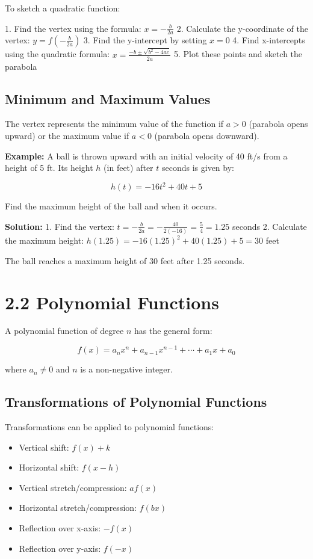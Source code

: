\documentclass[12pt]{article}
\begin{document}
To sketch a quadratic function:

1. Find the vertex using the formula: $x = -\frac{b}{2a}$
2. Calculate the y-coordinate of the vertex: $y = f(-\frac{b}{2a})$
3. Find the y-intercept by setting $x = 0$
4. Find x-intercepts using the quadratic formula: $x = \frac{-b \pm \sqrt{b^2 - 4ac}}{2a}$
5. Plot these points and sketch the parabola

\subsection{Minimum and Maximum Values}

The vertex represents the minimum value of the function if $a > 0$ (parabola opens upward) or the maximum value if $a < 0$ (parabola opens downward).

\textbf{Example:} A ball is thrown upward with an initial velocity of 40 ft/s from a height of 5 ft. Its height $h$ (in feet) after $t$ seconds is given by:

\[h(t) = -16t^2 + 40t + 5\]

Find the maximum height of the ball and when it occurs.

\textbf{Solution:}
1. Find the vertex: $t = -\frac{b}{2a} = -\frac{40}{2(-16)} = \frac{5}{4} = 1.25$ seconds
2. Calculate the maximum height: $h(1.25) = -16(1.25)^2 + 40(1.25) + 5 = 30$ feet

The ball reaches a maximum height of 30 feet after 1.25 seconds.

\section{2.2 Polynomial Functions}

A polynomial function of degree $n$ has the general form:

\[f(x) = a_nx^n + a_{n-1}x^{n-1} + \cdots + a_1x + a_0\]

where $a_n \neq 0$ and $n$ is a non-negative integer.

\subsection{Transformations of Polynomial Functions}

Transformations can be applied to polynomial functions:

\begin{itemize}
    \item Vertical shift: $f(x) + k$
    \item Horizontal shift: $f(x - h)$
    \item Vertical stretch/compression: $af(x)$
    \item Horizontal stretch/compression: $f(bx)$
    \item Reflection over x-axis: $-f(x)$
    \item Reflection over y-axis: $f(-x)$
\end{itemize}
\end{document}
